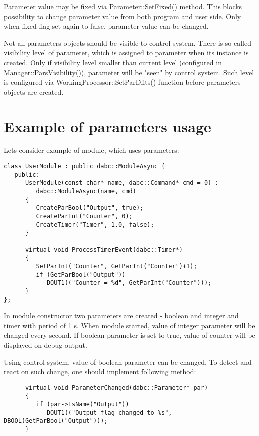 Parameter value may be fixed via Parameter::SetFixed() method. This blocks possibility 
to change parameter value from both program and user side. Only when fixed flag set again to false,
parameter value can be changed. 

Not all parameters objects should be visible to control system. There is so-called 
visibility level of parameter, which is assigned to parameter when its instance is created.
Only if visibility level smaller than current level (configured in Manager::ParsVisibility()),
parameter will be "seen" by control system. Such level is configured  
via WorkingProcessor::SetParDflts() function before parameters objects are created.


\section{Example of parameters usage}

Lets consider example of module, which uses parameters:

\begin{verbatim}
class UserModule : public dabc::ModuleAsync {
   public:
      UserModule(const char* name, dabc::Command* cmd = 0) : 
         dabc::ModuleAsync(name, cmd)
      {
         CreateParBool("Output", true);
         CreateParInt("Counter", 0);
         CreateTimer("Timer", 1.0, false);
      }
      
      virtual void ProcessTimerEvent(dabc::Timer*)
      {
         SetParInt("Counter", GetParInt("Counter")+1);
         if (GetParBool("Output")) 
            DOUT1(("Counter = %d", GetParInt("Counter")));
      }
}; 
\end{verbatim}

In module constructor two parameters are created - boolean and integer and timer with period of 1 s.
When module started, value of integer parameter will be changed every second.
If boolean parameter is set to true, value of counter will be displayed on debug output.

Using control system, value of boolean parameter can be changed. To detect and react on such change,
one should implement following method: 
 
\begin{verbatim}
      virtual void ParameterChanged(dabc::Parameter* par) 
      {
         if (par->IsName("Output")) 
            DOUT1(("Output flag changed to %s", DBOOL(GetParBool("Output")));
      }
\end{verbatim}

